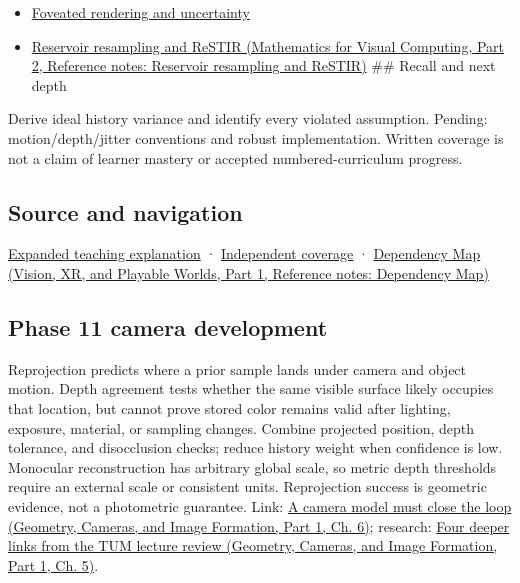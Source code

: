 \hypertarget{appendix-0727340a4428-used-by}{}

\begin{itemize}
\item
  \hyperref[appendix-5878b813b732]{Foveated rendering and uncertainty}
\item
  \href{../02-Mathematics-for-Visual-Computing-P02/main.pdf\#nameddest=appendix-68be451b78b1}{Reservoir resampling and ReSTIR (Mathematics for Visual Computing, Part 2, Reference notes: Reservoir resampling and ReSTIR)} \#\# Recall and next depth
\end{itemize}

Derive ideal history variance and identify every violated assumption. Pending: motion/depth/jitter conventions and robust implementation. Written coverage is not a claim of learner mastery or accepted numbered-curriculum progress.

\subsection{Source and navigation}\label{appendix-0727340a4428-source-and-navigation}

\hypertarget{appendix-0727340a4428-source-and-navigation}{}

\hyperref[04-visual-computing-ii-ch042-temporal-reconstruction-is-an-inference-about-correspondence]{Expanded teaching explanation} · \hyperref[appendix-fd090d982a15-xr01---independent-seeing-and-representation-source]{Independent coverage} · \href{../07-Vision-XR-and-Playable-Worlds-P01/main.pdf\#nameddest=appendix-4ad47bdd269a}{Dependency Map (Vision, XR, and Playable Worlds, Part 1, Reference notes: Dependency Map)}

\subsection{Phase 11 camera development}\label{appendix-0727340a4428-phase-11-camera-development}

\hypertarget{appendix-0727340a4428-phase-11-camera-development}{}

Reprojection predicts where a prior sample lands under camera and object motion. Depth agreement tests whether the same visible surface likely occupies that location, but cannot prove stored color remains valid after lighting, exposure, material, or sampling changes. Combine projected position, depth tolerance, and disocclusion checks; reduce history weight when confidence is low. Monocular reconstruction has arbitrary global scale, so metric depth thresholds require an external scale or consistent units. Reprojection success is geometric evidence, not a photometric guarantee. Link: \href{../03-Geometry-Cameras-and-Image-Formation-P01/main.pdf\#nameddest=02-foundations-ii-ch037-a-camera-model-must-close-the-loop}{A camera model must close the loop (Geometry, Cameras, and Image Formation, Part 1, Ch. 6)}; research: \href{../03-Geometry-Cameras-and-Image-Formation-P01/main.pdf\#nameddest=02-foundations-ii-ch036-four-deeper-links-from-the-tum-lecture-review}{Four deeper links from the TUM lecture review (Geometry, Cameras, and Image Formation, Part 1, Ch. 5)}.

